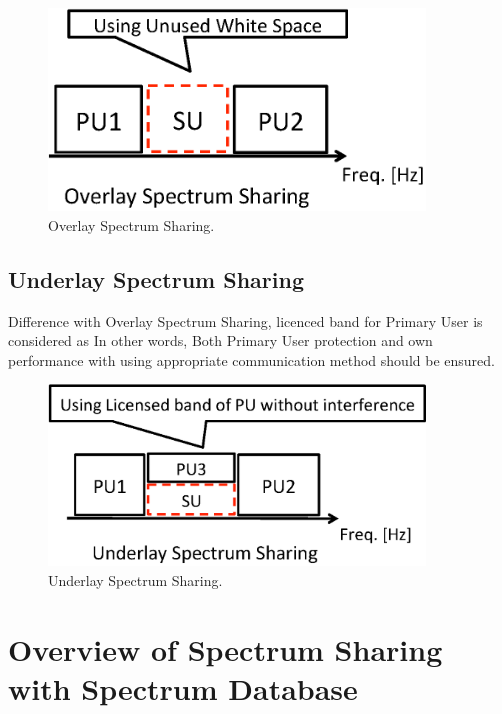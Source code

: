 \begin{figure}[!htp]
\begin{center}
\includegraphics[width=100mm,clip]{overlay.eps}
\caption{Overlay Spectrum Sharing.}
\label{fig:overlay}
\end{center}
\end{figure}

\subsection{Underlay Spectrum Sharing}
 Difference with Overlay Spectrum Sharing, licenced band for Primary User is considered as In other words, Both Primary User protection and own performance with using appropriate communication method should be ensured.
\begin{figure}[!htp]
\begin{center}
\includegraphics[width=100mm,clip]{underlay.eps}
\caption{Underlay Spectrum Sharing.}
\label{fig:underlay}
\end{center}
\end{figure}

\section{Overview of Spectrum Sharing with Spectrum Database}
